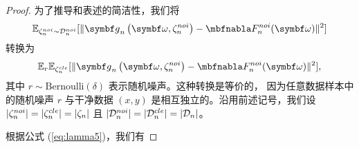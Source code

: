 \begin{proof}
为了推导和表述的简洁性，我们将
$$
\mathbb{E}_{\zetanoi_n\sim \Dnoi_n}[\Vert \gb_n\left(\omegab,\zetanoi_n\right) - \nabla \fnoi_n(\omegab) \Vert^2 ]
$$
转换为
$$
\mathbb{E}_r\mathbb{E}_{\zetacle_n}[\Vert \gb_n\left(\omegab,\zetanoi_n\right) - \nabla \fnoi_n(\omegab) \Vert^2 ],
$$
其中 $r \sim \text{Bernoulli}(\delta)$ 表示随机噪声。这种转换是等价的，
因为任意数据样本中的随机噪声 $r$ 与干净数据 $(x,y)$ 是相互独立的。沿用前述记号，我们设 $|\zeta^{noi}_n|=|\zeta^{cle}_n|=|\zeta_n|$ 且 $|\mathcal{D}^{noi}_n|=|\mathcal{D}^{cle}_n|=|\mathcal{D}_n|$。

根据公式 (\ref{eq:lamma5})，我们有


\end{proof}
